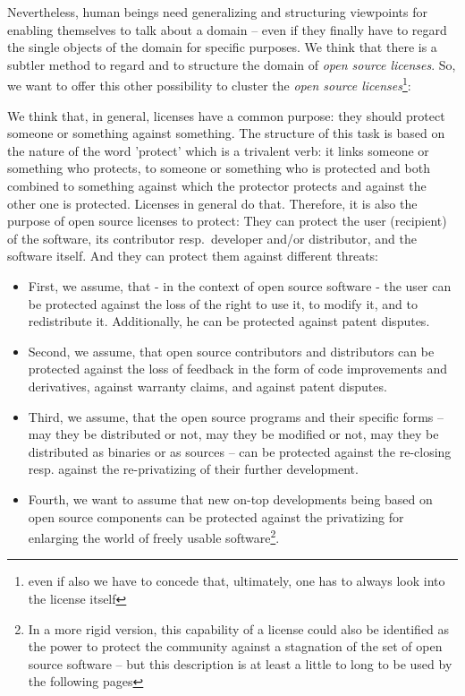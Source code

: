 Nevertheless, human beings need generalizing and structuring viewpoints for
enabling themselves to talk about a domain -- even if they finally have to regard
the single objects of the domain for specific purposes. We think that there is
a subtler method to regard and to structure the domain of \emph{open source
licenses}. So, we want to offer this other possibility to cluster the \emph{open
source licenses}\footnote{even if also we have to concede that, ultimately, 
one has to always look into the license itself}:

We think that, in general, licenses have a common purpose: they should protect
someone or something against something. The structure of this task is based on
the nature of the word 'protect' which is a trivalent verb: it links someone or
something who protects, to someone or something who is protected and both
combined to something against which the protector protects and against the other one
is protected. Licenses in general do that. Therefore, it is also the purpose of
open source licenses to protect: They can protect the user (recipient) of the
software, its contributor resp.\ developer and/or distributor, and the software
itself. And they can protect them against different threats:

\begin{itemize}
  \item First, we assume, that - in the context of open source software - the
  user can be protected against the loss of the right to use it, to modify it,
  and to redistribute it. Additionally, he can be protected against patent
  disputes.
  \item Second, we assume, that open source contributors and distributors can be
  protected against the loss of feedback in the form of code improvements and
  derivatives, against warranty claims, and against patent disputes.
  \item Third, we assume, that the open source programs and their specific forms
  -- may they be distributed or not, may they be modified or not, may they be
  distributed as binaries or as sources -- can be protected against the
  re-closing resp. against the re-privatizing of their further development.
  \item Fourth, we want to assume that new on-top developments being based on
  open source components can be protected against the privatizing for enlarging
  the world of freely usable software\footnote{In a more rigid version, this
  capability of a license could also be identified as the power to protect the
  community against a stagnation of the set of open source software -- but this
  description is at least a little to long to be used by the following pages}.
\end{itemize}

